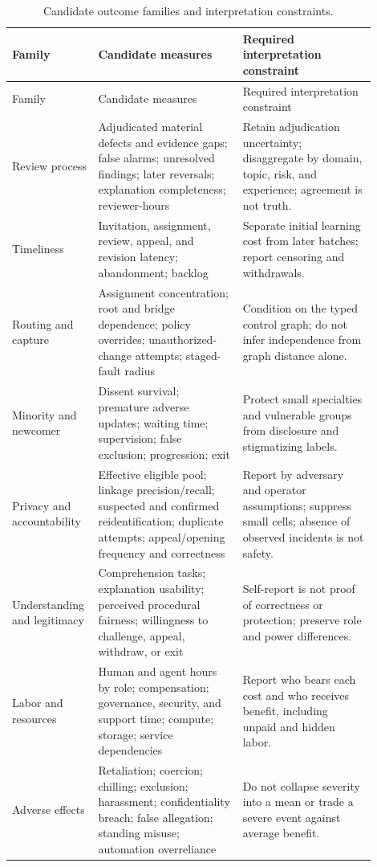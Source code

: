 \documentclass[11pt]{article}
\begin{document}
\begin{longtable}{p{0.17\linewidth}p{0.38\linewidth}p{0.35\linewidth}}
\caption{Candidate outcome families and interpretation constraints.}\label{tab:outcomes}\\
\toprule
Family & Candidate measures & Required interpretation constraint \\
\midrule
\endfirsthead
\toprule
Family & Candidate measures & Required interpretation constraint \\
\midrule
\endhead
Review process & Adjudicated material defects and evidence gaps; false alarms;
unresolved findings; later reversals; explanation completeness; reviewer-hours &
Retain adjudication uncertainty; disaggregate by domain, topic, risk, and
experience; agreement is not truth. \\
Timeliness & Invitation, assignment, review, appeal, and revision latency;
abandonment; backlog & Separate initial learning cost from later batches; report
censoring and withdrawals. \\
Routing and capture & Assignment concentration; root and bridge dependence; policy
overrides; unauthorized-change attempts; staged-fault radius & Condition on the
typed control graph; do not infer independence from graph distance alone. \\
Minority and newcomer & Dissent survival; premature adverse updates; waiting time;
supervision; false exclusion; progression; exit & Protect small specialties and
vulnerable groups from disclosure and stigmatizing labels. \\
Privacy and accountability & Effective eligible pool; linkage precision/recall;
suspected and confirmed reidentification; duplicate attempts; appeal/opening
frequency and correctness & Report by adversary and operator assumptions; suppress
small cells; absence of observed incidents is not safety. \\
Understanding and legitimacy & Comprehension tasks; explanation usability;
perceived procedural fairness; willingness to challenge, appeal, withdraw, or exit
& Self-report is not proof of correctness or protection; preserve role and power
differences. \\
Labor and resources & Human and agent hours by role; compensation; governance,
security, and support time; compute; storage; service dependencies & Report who
bears each cost and who receives benefit, including unpaid and hidden labor. \\
Adverse effects & Retaliation; coercion; chilling; exclusion; harassment;
confidentiality breach; false allegation; standing misuse; automation overreliance
& Do not collapse severity into a mean or trade a severe event against average
benefit. \\
\bottomrule
\end{longtable}
\end{document}
